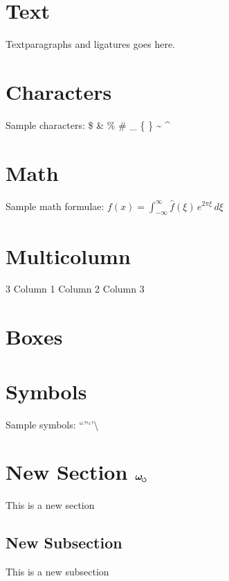 \documentclass{article}
\newcommand{\omegas}{\boldsymbol{\omega}_{\mkern-2mu\scriptscriptstyle\boldsymbol{\circlearrowleft}}}  %
\begin{document}
    \section{Text}
    Text\quad paragraphs and ligatures goes here.

    \section{Characters}
    Sample characters:
    \$ \& \% \# \_ \{ \} \~{} \^{}


    \section{Math}
    Sample math formulae:
    $f(x) = \int_{-\infty}^\infty \hat f(\xi)\,e^{2 \pi \xi} \, d\xi$

    \section{Multicolumn}
    \begin{multicols}{3}
        Column 1
        Column 2
        Column 3
    \end{multicols}

    \section{Boxes}
    \medbreak\noindent{}\smallbreak

    \section{Symbols}
    Sample symbols:
    \noindent \textfractionsolidus \textdiv \texttimes \textminus \textpm \textsurd \textlnot \textasteriskcentered
    \textbullet \textperiodcentered \textdagger \textdaggerdbl \textsection \textparagraph \textbardbl \textellipsis
    \textquotedblleft \textquotedblright \textquoteleft \textquoteright \textbackslash \textbullet \textemdash \textendash


\section{New Section \texorpdfstring{$\omegas$}{omegas}}
This is a new section
\subsection{New Subsection}
This is a new subsection
\end{document}
